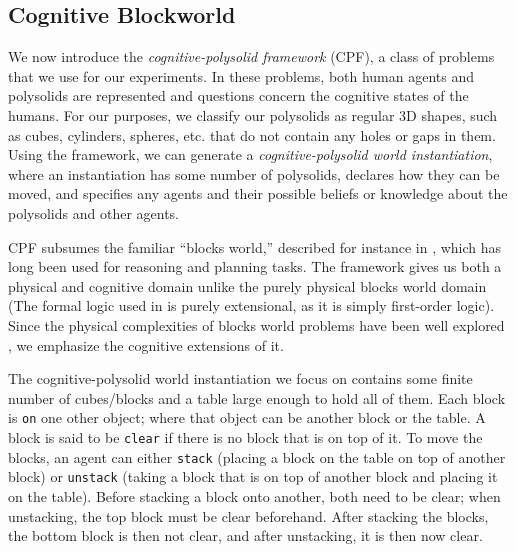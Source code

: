 \subsection{Cognitive Blockworld}

We now introduce the \emph{cognitive-polysolid framework} (CPF), a
class of problems that we use for our experiments. In these problems,
both human agents and polysolids are represented and questions concern the
cognitive states of the humans. For our purposes,
we classify our polysolids as regular 3D shapes, such as cubes, cylinders, spheres, etc.
that do not contain any holes or gaps in them. Using
the framework, we can generate a \emph{cognitive-polysolid world
instantiation}, where an instantiation has some number of polysolids,
declares how they can be moved, and specifies any agents and their possible
beliefs or knowledge about the polysolids and other agents.

CPF subsumes the familiar ``blocks world,'' described for instance in
\cite{nilsson_principles_1982}, which has long been used for reasoning and
planning tasks.  The framework gives us both a physical and cognitive
domain unlike the purely physical blocks world domain (The formal
logic used in \cite{nilsson_principles_1982} is purely extensional, as it is
simply first-order logic).  Since the physical complexities of blocks
world problems have been well explored
\cite{gupta_complexity_1992,slaney_blocks_2001}, we emphasize the cognitive extensions
of it.

The cognitive-polysolid world instantiation we focus on contains some finite number
of cubes/blocks and a table large enough to hold all of them.  Each block is
\texttt{on} one other object; where that object can be another block or the
table.  A block is said to be \texttt{clear} if there is no block that
is on top of it.  To move the blocks, an agent can either
\texttt{stack} (placing a block on the table on top of another block)
or \texttt{unstack} (taking a block that is on top of another block
and placing it on the table).  Before stacking a block onto another, both need
to be clear; when unstacking, the top block must be clear beforehand.
After stacking the blocks, the bottom block is then not clear, and
after unstacking, it is then now clear.

